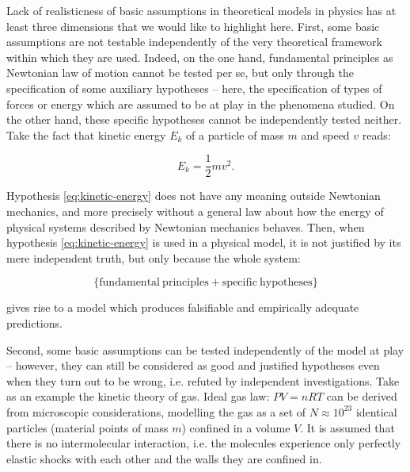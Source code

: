 \documentclass[a4paper,11pt]{article}
\theoremstyle{definition}
\begin{document}
Lack of realisticness of basic assumptions in theoretical models in physics has at least three dimensions that we would like to highlight here. First, some basic assumptions are not testable independently of the very theoretical framework within which they are used. Indeed, on the one hand, fundamental principles as Newtonian law of motion cannot be tested per se, but only through the specification of some auxiliary hypotheses -- here, the specification of types of forces or energy which are assumed to be at play in the phenomena studied. On the other hand, these specific hypotheses cannot be independently tested neither. Take the fact that kinetic energy $E_k$ of a particle of mass $m$ and speed $v$ reads: 

\begin{equation}
E_k=\frac{1}{2}mv^2.
\label{eq:kinetic-energy}
\end{equation}

Hypothesis \eqref{eq:kinetic-energy} does not have any meaning outside Newtonian mechanics, and more precisely without a general law about how the energy of physical systems described by Newtonian mechanics behaves. Then, when hypothesis \eqref{eq:kinetic-energy} is used in a physical model, it is not justified by its mere independent truth, but only because the whole system:

\begin{equation}
\{\mathrm{fundamental~principles + specific~hypotheses}\}
\label{eq:pattern_expl}
\end{equation}

gives rise to a model which produces falsifiable and empirically adequate predictions.

Second, some basic assumptions can be tested independently of the model at play -- however, they can still be considered as good and justified hypotheses even when they turn out to be wrong, i.e. refuted by independent investigations. Take as an example the kinetic theory of gas. Ideal gas law: $PV=nRT$ can be derived from microscopic considerations, modelling the gas as a set of $N\approx 10^{23}$ identical particles (material points of mass $m$) confined in a volume $V$. It is assumed that there is no intermolecular interaction, i.e. the molecules experience only perfectly elastic shocks with each other and the walls they are confined in.
\end{document}
